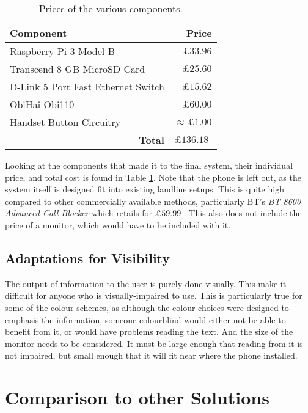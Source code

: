 \documentclass[main.tex]{subfiles}
\begin{document}
\begin{table}[htb]
	\centering
	\begin{tabular}{|l|r|}
		\hline
		\textbf{Component} 							& \textbf{Price}    								\\\hline
		Raspberry Pi 3 Model B        				& $\pounds 33.96$   								\\
		Transcend 8 GB MicroSD Card 				& $\pounds 25.60$   								\\
		D-Link 5 Port Fast Ethernet Switch 			& $\pounds 15.62$   								\\
		ObiHai Obi110           					& $\pounds 60.00$      								\\
		Handset Button Circuitry    				& $\approx \pounds 1.00$ 							\\\hline
		\multicolumn{1}{|r|}{\textbf{Total}}  & \multicolumn{1}{|l|}{$\pounds 136.18$}  	\\\hline
	\end{tabular}
	\caption{Prices of the various components.}
	\label{tbl:costs}
\end{table}

Looking at the components that made it to the final system, their individual price, and total cost is found in Table \ref{tbl:costs}. Note that the phone is left out, as the system itself is designed fit into existing landline setups. This is quite high compared to other commercially available methods, particularly BT's \textit{BT 8600 Advanced Call Blocker} which retails for $\pounds 59.99$ \cite{bt-block}. This also does not include the price of a monitor, which would have to be included with it.

\subsection{Adaptations for Visibility}
The output of information to the user is purely done visually. This make it difficult for anyone who is visually-impaired to use. This is particularly true for some of the colour schemes, as although the colour choices were designed to emphasis the information, someone colourblind would either not be able to benefit from it, or would have problems reading the text. And the size of the monitor needs to be considered. It must be large enough that reading from it is not impaired, but small enough that it will fit near where the phone installed.

\section{Comparison to other Solutions}
\end{document}
